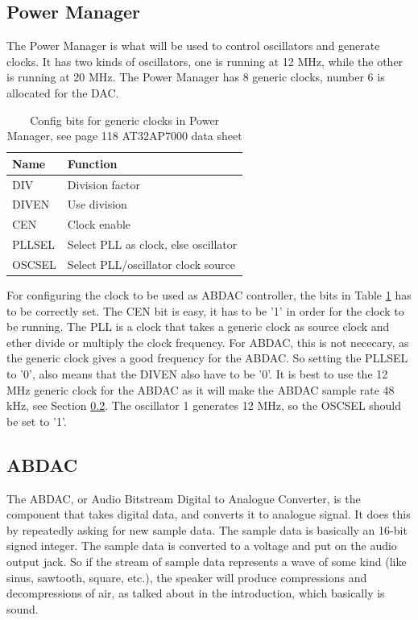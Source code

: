 \documentclass[12pt,a4paper,final]{report}
\numberwithin{equation}{section}
\numberwithin{table}{section}
\numberwithin{figure}{section}
\begin{document}
\subsection{Power Manager}
\label{sec:powermanager}

The Power Manager is what will be used to control oscillators and generate clocks. It has two kinds of oscillators, one is running at 12 MHz, while the other is running at 20 MHz. The Power Manager has 8 generic clocks, number 6 is allocated for the DAC. 

\begin{table}[H]
\centering
\begin{tabular}{|l|l|}
\hline
Name & Function\\
\hline
DIV & Division factor\\
DIVEN & Use division\\
CEN & Clock enable\\
PLLSEL & Select PLL as clock, else oscillator\\
OSCSEL & Select PLL/oscillator clock source\\
\hline
\end{tabular}
\caption{Config bits for generic clocks in Power Manager, see page 118 AT32AP7000 data sheet\cite{at32ap7000}}
\label{tab:genericclock}
\end{table}

For configuring the clock to be used as ABDAC controller, the bits in Table \ref{tab:genericclock} has to be correctly set. The CEN bit is easy, it has to be '1' in order for the clock to be running. The PLL is a clock that takes a generic clock as source clock and ether divide or multiply the clock frequency. For ABDAC, this is not nececary, as the generic clock gives a good frequency for the ABDAC. So setting the PLLSEL to '0', also means that the DIVEN also have to be '0'. It is best to use the 12 MHz generic clock for the ABDAC as it will make the ABDAC sample rate 48 kHz, see Section \ref{sec:abdac}. The oscillator 1 generates 12 MHz, so the OSCSEL should be set to '1'.


\subsection{ABDAC}
\label{sec:abdac}

The ABDAC, or Audio Bitstream Digital to Analogue Converter, is the component that takes digital data, and converts it to analogue signal. It does this by repeatedly asking for new sample data. The sample data is basically an 16-bit signed integer. The sample data is converted to a voltage and put on the audio output jack. So if the stream of sample data represents a wave of some kind (like sinus, sawtooth, square, etc.), the speaker will produce compressions and decompressions of air, as talked about in the introduction, which basically is sound. 
\end{document}
